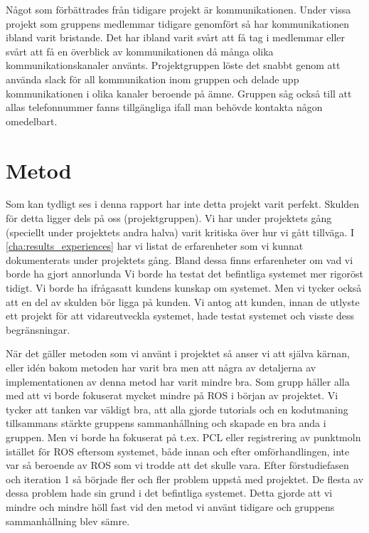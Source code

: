 Något som förbättrades från tidigare projekt är kommunikationen. Under vissa projekt som gruppens medlemmar tidigare genomfört så har kommunikationen ibland varit bristande. Det har ibland varit svårt att få tag i medlemmar eller svårt att få en överblick av kommunikationen då många olika kommunikationskanaler använts. Projektgruppen löste det snabbt genom att använda slack för all kommunikation inom gruppen och delade upp kommunikationen i olika kanaler beroende på ämne. Gruppen såg också till att allas telefonnummer fanns tillgängliga ifall man behövde kontakta någon omedelbart.

\section{Metod}
\label{sec:discussion-method}
Som kan tydligt ses i denna rapport har inte detta projekt varit perfekt. Skulden för detta ligger dels på oss (projektgruppen). Vi har under projektets gång (speciellt under projektets andra halva) varit kritiska över hur vi gått tillväga. I \ref{cha:results_experiences} har vi listat de erfarenheter som vi kunnat dokumenterats under projektets gång. Bland dessa finns erfarenheter om vad vi borde ha gjort annorlunda Vi borde ha testat det befintliga systemet mer rigoröst tidigt. Vi borde ha ifrågasatt kundens kunskap om systemet. Men vi tycker också att en del av skulden bör ligga på kunden. Vi antog att kunden, innan de utlyste ett projekt för att vidareutveckla systemet, hade testat systemet och visste dess begränsningar.

När det gäller metoden som vi använt i projektet så anser vi att själva kärnan, eller idén bakom metoden har varit bra men att några av detaljerna av implementationen av denna metod har varit mindre bra. Som grupp håller alla med att vi borde fokuserat mycket mindre på ROS i början av projektet. Vi tycker att tanken var väldigt bra, att alla gjorde tutorials och en kodutmaning tillsammans stärkte gruppens sammanhållning och skapade en bra anda i gruppen. Men vi borde ha fokuserat på t.ex. PCL eller registrering av punktmoln istället för ROS eftersom systemet, både innan och efter omförhandlingen, inte var så beroende av ROS som vi trodde att det skulle vara. Efter förstudiefasen och iteration 1 så började fler och fler problem uppstå med projektet. De flesta av dessa problem hade sin grund i det befintliga systemet. Detta gjorde att vi mindre och mindre höll fast vid den metod vi använt tidigare och gruppens sammanhållning blev sämre.      

